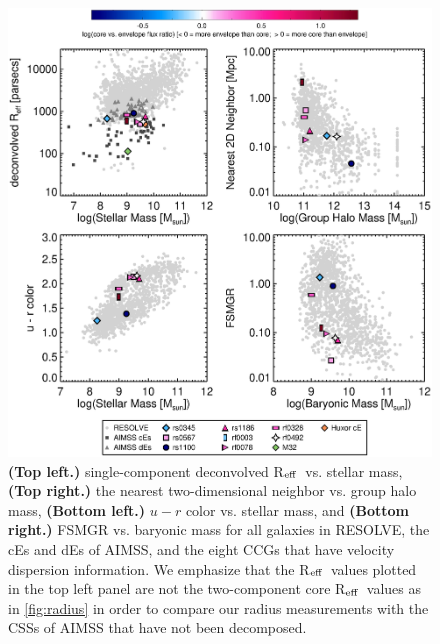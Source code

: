 \documentclass[iop,apj]{emulateapj}
\newcommand{\Reff}{R$_{\rm eff}$}
\begin{document}
\begin{figure}[b]
\begin{center}
\includegraphics[scale=0.7]{miniplots.eps}
\caption{\textbf{(Top left.)} single-component deconvolved \Reff\ vs. stellar mass, \textbf{(Top right.)} the nearest two-dimensional neighbor vs. group halo mass, \textbf{(Bottom left.)} $u-r$ color vs. stellar mass, and \textbf{(Bottom right.)} FSMGR vs. baryonic mass for all galaxies in RESOLVE, the cEs and dEs of AIMSS, and the eight CCGs that have velocity dispersion information. We emphasize that the \Reff\ values plotted in the top left panel are not the two-component core \Reff\ values as in \autoref{fig:radius} in order to compare our radius measurements with the CSSs of AIMSS that have not been decomposed.}
\label{fig:miniplots}
\end{center}
\end{figure}
\end{document}
